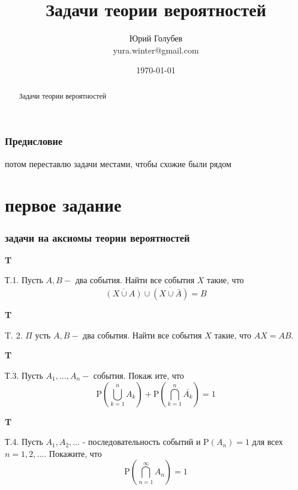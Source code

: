 \documentclass[a4paper,12pt]{article} %
\author{Юрий Голубев\\ yura.winter@gmail.com }
\title{Задачи теории вероятностей}
\date{\today}
\begin{document}
\maketitle

\begin{abstract}
Задачи теории вероятностей
\end{abstract}
\tableofcontents

\section*{Предисловие}

потом переставлю задачи местами, чтобы схожие были рядом


\clearpage
\part{первое задание}


\section{задачи на аксиомы теории вероятностей}

\begin{example}\textbf{T}


Т.1. Пусть $A, B-$ два события. Найти все события $X$ такие, что
$$
\overline{(X \cup A)} \cup \overline{(X \cup \bar{A})}=B
$$

\end{example}


\begin{example}\textbf{T}

T. 2. $\Pi$ усть $A, B-$ два события. Найти все события $X$ такие, что $A X=A B$.



\end{example}


\begin{example}\textbf{T}

Т.3. Пусть $A_{1}, \ldots, A_{n}-$ события. Покаж ите, что
$$
\mathrm{P}\left(\bigcup_{k=1}^{n} A_{k}\right)+\mathrm{P}\left(\bigcap_{k=1}^{n} \overline{A_{k}}\right)=1
$$


\end{example}




\begin{example}\textbf{T}

Т.4. Пусть $A_{1}, A_{2}, \ldots$ - последовательность событий и $\mathrm{P}\left(A_{n}\right)=1$ для всех $n=1,2, \ldots .$ Покажите, что
$$
\mathrm{P}\left(\bigcap_{n=1}^{\infty} A_{n}\right)=1
$$


\end{example}
\end{document}
